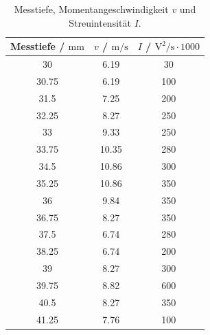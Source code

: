 \documentclass[
  bibliography=totoc,     %
  captions=tableheading,  %
  titlepage=firstiscover, %
]{scrartcl}
\begin{document}
      \begin{table}
        \centering
        \begin{tabular}{c c c}
            \toprule
            Messtiefe / $\si{\meter\meter}$ & $v$ / $\si{\meter\per\second}$ &
            $I$ / $\si{\volt\squared\per\second} \cdot 1000$ \\
            \midrule
            30 & 6.19 & 30 \\
            30.75 &  6.19 & 100 \\
            31.5 & 7.25 & 200 \\
            32.25 & 8.27 & 250 \\
            33 & 9.33 & 250 \\
            33.75 &  10.35 & 280 \\
            34.5 & 10.86 & 300 \\
            35.25 & 10.86 & 350 \\
            36 & 9.84 & 350 \\
            36.75 & 8.27 & 350 \\
            37.5 & 6.74 & 280 \\
            38.25 & 6.74 & 200 \\
            39 & 8.27 & 300 \\
            39.75 & 8.82 & 600 \\
            40.5 & 8.27 & 350 \\
            41.25 & 7.76 & 100 \\
            \bottomrule
        \end{tabular}
        \caption{Messtiefe, Momentangeschwindigkeit $v$ und Streuintensität $I$.}
        \label{tab:5}
      \end{table}
\end{document}
